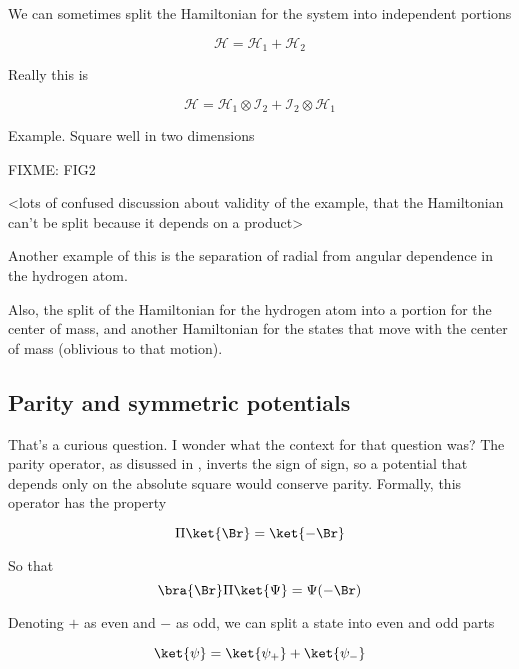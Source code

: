 We can sometimes split the Hamiltonian for the system into independent portions

\begin{equation}\label{eqn:qmTwoR1:n}
\mathcal{H} = \mathcal{H}_1 + \mathcal{H}_2
\end{equation}

Really this is

\begin{equation}\label{eqn:qmTwoR1:n}
\mathcal{H} = 
\mathcal{H}_1 \otimes \mathcal{I}_2 
+\mathcal{I}_2 \otimes \mathcal{H}_1 
\end{equation}

Example.  Square well in two dimensions

FIXME: FIG2

<lots of confused discussion about validity of the example, that the Hamiltonian can't be split because it depends on a product>

Another example of this is the separation of radial from angular dependence in the hydrogen atom.

Also, the split of the Hamiltonian for the hydrogen atom into a portion for the center of mass, and another Hamiltonian for the states that move with the center of mass (oblivious to that motion).

\subsection{Parity and symmetric potentials}

That's a curious question.  I wonder what the context for that question was?  The parity operator, as disussed in \cite{wiki:parity}, inverts the sign of sign, so a potential that depends only on the absolute square would conserve parity.  Formally, this operator has the property

\begin{equation}\label{eqn:qmTwoR1:n}
\Pi \ket{\Br} = \ket{-\Br}
\end{equation}

So that
\begin{equation}\label{eqn:qmTwoR1:n}
\bra{\Br} \Pi \ket{\Psi} = \Psi(-\Br)
\end{equation}

Denoting $+$ as even and $-$ as odd, we can split a state into even and odd parts

\begin{equation}\label{eqn:qmTwoR1:n}
\ket{\psi} =
\ket{\psi_{+}}
+\ket{\psi_{-}}
\end{equation}

